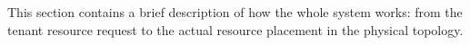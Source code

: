 This section contains a brief description of how the whole system works: from the tenant resource request to the actual resource placement in the physical topology.